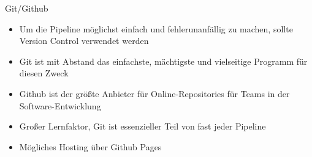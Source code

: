 \documentclass[usenames,dvipsnames,10pt]{beamer}
\begin{document}
    \begin{frame}{Git/Github}
            \begin{itemize}
                \item Um die Pipeline möglichst einfach und fehlerunanfällig zu machen, sollte Version Control verwendet werden
                \item Git ist mit Abstand das einfachste, mächtigste und vielseitige Programm für diesen Zweck
                \item Github ist der größte Anbieter für Online-Repositories für Teams in der Software-Entwicklung
                \item Großer Lernfaktor, Git ist essenzieller Teil von fast jeder Pipeline
                \item Mögliches Hosting über Github Pages
            \end{itemize}
    \end{frame}
\end{document}

